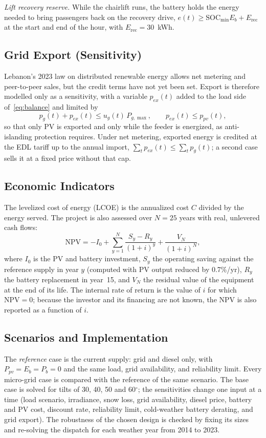 \emph{Lift recovery reserve.} While the chairlift runs, the battery holds the energy needed to bring
passengers back on the recovery drive, $e(t) \ge \mathrm{SOC}_{\min}E_b + E_{\mathrm{rec}}$ at the start and
end of the hour, with $E_{\mathrm{rec}}=30$~kWh.

\subsection{Grid Export (Sensitivity)}
Lebanon's 2023 law on distributed renewable energy allows net metering and peer-to-peer sales, but
the credit terms have not yet been set. Export is therefore modelled only as a sensitivity, with a
variable $p_{ex}(t)$ added to the load side of~\eqref{eq:balance} and limited by
\begin{equation}
p_g(t) + p_{ex}(t) \le u_g(t)\,P_{g,\max}, \qquad p_{ex}(t) \le p_{pv}(t),
\label{eq:export}
\end{equation}
so that only PV is exported and only while the feeder is energized, as anti-islanding protection
requires. Under net metering, exported energy is credited at the EDL tariff up to the annual import,
$\sum_t p_{ex}(t) \le \sum_t p_g(t)$; a second case sells it at a fixed price without that cap.

\subsection{Economic Indicators}
The levelized cost of energy (LCOE) is the annualized cost $C$ divided by the energy served. The project is also assessed over $N=25$ years with real, unlevered cash flows:
\begin{equation}
\mathrm{NPV} = -I_0 + \sum_{y=1}^{N} \frac{S_y - R_y}{(1+i)^y} + \frac{V_N}{(1+i)^N},
\label{eq:npv}
\end{equation}
where $I_0$ is the PV and battery investment, $S_y$ the operating saving against the reference supply
in year $y$ (computed with PV output reduced by 0.7\%/yr), $R_y$ the battery replacement in year~15,
and $V_N$ the residual value of the equipment at the end of its life. The internal rate of return is
the value of $i$ for which $\mathrm{NPV}=0$; because the investor and its financing are not known, the
NPV is also reported as a function of $i$.

\subsection{Scenarios and Implementation}
The \emph{reference} case is the current supply: grid and diesel only, with $P_{pv}=E_b=P_b=0$ and the
same load, grid availability, and reliability limit. Every micro-grid case is compared with the
reference of the same scenario. The base case is solved for tilts of 30, 40, 50 and 60$^\circ$; the
sensitivities change one input at a time (load scenario, irradiance, snow loss, grid availability,
diesel price, battery and PV cost, discount rate, reliability limit, cold-weather battery derating, and
grid export). The robustness of the chosen design is checked by fixing its sizes and re-solving the
dispatch for each weather year from 2014 to 2023.

